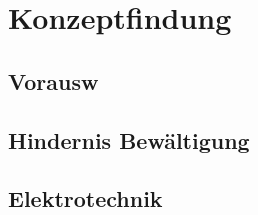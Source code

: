 \newpage
\section{Konzeptfindung}

\subsection{Vorausw}
\subsection{Hindernis Bewältigung}
    \subsubsection{}

\subsection{Elektrotechnik}
\subsubsection{}